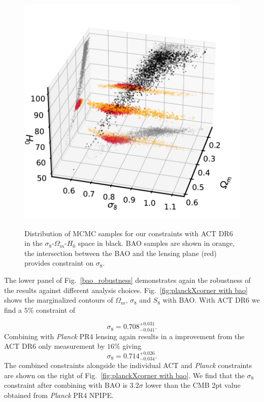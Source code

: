 \documentclass[twocolumn]{aastex631}
\begin{document}
{\begin{figure}
    \centering
    \includegraphics[width=\linewidth]{figures/3dfig.pdf} \\ %
    \caption{Distribution of MCMC samples for our constraints with ACT DR6 in the $\sigma_8$-$\Omega_m$-$H_0$ space in black. BAO samples are shown in orange, the intersection between the BAO and the lensing plane (red) provides constraint on $\sigma_8$.}
    \label{Fig. 3dplot}
\end{figure}

The lower panel of Fig.~\ref{bao_robustness} demonstrates again the robustness of the results against different analysis choices.
Fig.~\ref{fig:planckXcorner with bao} shows the marginalized contours of $\Omega_m$, $\sigma_8$ and $S_8$ with BAO. With ACT DR6 we find a $5\%$ constraint of 

\begin{equation}
    \sigma_8=0.708^{+0.031}_{-0.041}.
\end{equation} 
Combining with \textit{Planck} PR4 lensing again results in a improvement from the ACT DR6 only measurement by $16\%$ giving
\begin{equation}
    \sigma_8=0.714^{+0.026}_{-0.034}.
\end{equation}
The combined constraints alongside the individual ACT and \textit{Planck} constraints are shown on the right of Fig.~\ref{fig:planckXcorner with bao}. We find that the $\sigma_8$
constraint after combining with BAO is $3.2\sigma$ lower than the CMB 2pt value obtained from \textit{Planck} PR4 NPIPE. 

}
\end{document}
